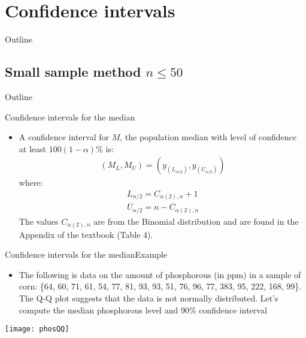 \documentclass[xcolor=dvipsnames]{beamer}
\begin{document}
\section{Confidence intervals}
\begin{frame}{Outline}
\tableofcontents[currentsection,subsectionstyle=show/shaded/hide]
\end{frame}

\subsection{Small sample method $n \leq 50$}
\begin{frame}{Outline}
\tableofcontents[currentsection,subsectionstyle=show/shaded/hide]
\end{frame}

\begin{frame}{Confidence intervals for the median}
	\begin{itemize}
		\item A confidence interval for $M$, the population median with level of confidence at least $100(1-\alpha)$\% is: \pause
		\begin{gather*}
		(M_L, M_U) = (y_{(L_{\alpha / 2})}, y_{(U_{\alpha/2})})
		\end{gather*} \pause
		where:
		\begin{gather*}
			L_{\alpha / 2} = C_{\alpha(2), n} + 1 \\
			U_{\alpha / 2} = n - C_{\alpha(2), n}
		\end{gather*} \pause
		The values $C_{\alpha(2),n}$ are from the Binomial distribution and are found in the Appendix of the textbook (Table 4).
	\end{itemize}
\end{frame}

\begin{frame}{Confidence intervals for the median}{Example}
	\begin{itemize}
		\item {\tiny The following is data on the amount of phosphorous (in ppm) in a sample of corn: \{64,  60, 71, 61, 54, 77, 81, 93, 93, 51, 76, 96, 77, 383, 95, 222, 168, 99\}. The Q-Q plot suggests that the data is not normally distributed. Let's compute the median phosphorous level and 90\% confidence interval }
	\end{itemize}
\vspace{-5pt}
\begin{center}
	\texttt{[image: phosQQ]}
\end{center}
\end{frame}
\end{document}

